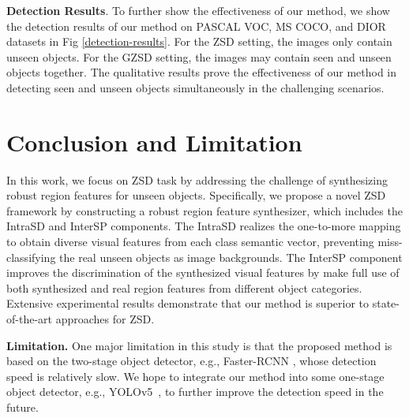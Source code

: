 \documentclass[10pt,twocolumn,letterpaper]{article}
\begin{document}
\textbf{Detection Results}. To further show the effectiveness of our method, we show the detection results of our method on PASCAL VOC, MS COCO, and DIOR datasets in Fig \ref{detection-results}. For the ZSD setting, the images only contain unseen objects. For the GZSD setting, the images may contain seen and unseen objects together. The qualitative results prove the effectiveness of our method in detecting seen and unseen objects simultaneously in the challenging scenarios.



\section{Conclusion and Limitation}
In this work, we focus on ZSD task by addressing the challenge of synthesizing robust region features for unseen objects.
Specifically, we propose a novel ZSD framework by constructing a robust region feature synthesizer, which includes the IntraSD and InterSP components. The IntraSD realizes the one-to-more mapping to obtain diverse visual features from each class semantic vector, preventing miss-classifying the real unseen objects as image backgrounds. The InterSP component improves the discrimination of the synthesized visual features by make full use of both synthesized and real region features from different object categories. Extensive experimental results demonstrate  that our method is superior to state-of-the-art approaches for ZSD.

\vspace{1mm}
\noindent \textbf{Limitation.} One major limitation in this study is that the proposed method is based on the two-stage object detector, e.g., Faster-RCNN \cite{ren2016faster}, whose detection speed is relatively slow. We hope to integrate our method into some one-stage object detector, e.g., YOLOv5~\cite{jocher2021ultralytics}, to further improve the detection speed in the future.



{\small


}
\end{document}
